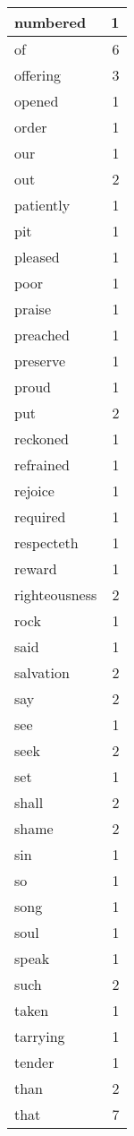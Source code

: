 \begin{center}
\begin{longtable}{l|r}
numbered & 1 \\ \hline
of & 6 \\ \hline
offering & 3 \\ \hline
opened & 1 \\ \hline
order & 1 \\ \hline
our & 1 \\ \hline
out & 2 \\ \hline
patiently & 1 \\ \hline
pit & 1 \\ \hline
pleased & 1 \\ \hline
poor & 1 \\ \hline
praise & 1 \\ \hline
preached & 1 \\ \hline
preserve & 1 \\ \hline
proud & 1 \\ \hline
put & 2 \\ \hline
reckoned & 1 \\ \hline
refrained & 1 \\ \hline
rejoice & 1 \\ \hline
required & 1 \\ \hline
respecteth & 1 \\ \hline
reward & 1 \\ \hline
righteousness & 2 \\ \hline
rock & 1 \\ \hline
said & 1 \\ \hline
salvation & 2 \\ \hline
say & 2 \\ \hline
see & 1 \\ \hline
seek & 2 \\ \hline
set & 1 \\ \hline
shall & 2 \\ \hline
shame & 2 \\ \hline
sin & 1 \\ \hline
so & 1 \\ \hline
song & 1 \\ \hline
soul & 1 \\ \hline
speak & 1 \\ \hline
such & 2 \\ \hline
taken & 1 \\ \hline
tarrying & 1 \\ \hline
tender & 1 \\ \hline
than & 2 \\ \hline
that & 7 \\ \hline

\end{longtable}
\end{center}
